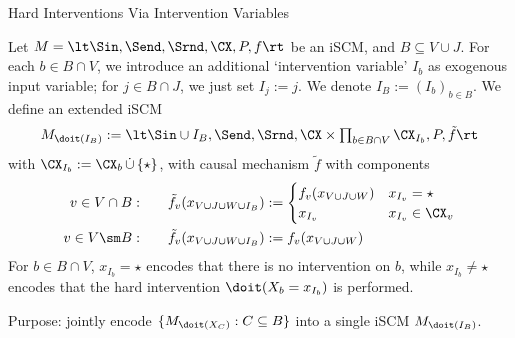 \begin{frame}{Hard Interventions Via Intervention Variables}
  \begin{Def}[\ref{def:scm_intervention_variables}]
  Let $M = \lt \Sin, \Send, \Srnd, \CX, P, f \rt$ be an iSCM, and $B \subseteq V \cup J$.
  For each $b \in B \cap V$, we introduce an additional `intervention variable' $I_b$ as exogenous input variable; for $j \in B \cap J$, we just set $I_j := j$.
  We denote $I_B := (I_b)_{b \in B}$.
  We define an extended iSCM 
  \vskip-2mm
  $$\textstyle M_{\doit(I_B)} := \lt \Sin \cup I_B, \Send, \Srnd, \CX \times \prod_{b \in B \cap V} \CX_{I_b}, P, \tilde{f} \rt$$
  with $\CX_{I_b} := \CX_b \,\dot\cup\, \{\star\}$, with causal mechanism $\tilde{f}$ with components
  \vskip-6mm
  \begin{align*}
    v \in V \cap B: \qquad &\tilde{f}_v(x_{V \cup J \cup W \cup I_B}) := \begin{cases}
      f_v(x_{V \cup J \cup W}) & x_{I_v} = \star \\
      x_{I_v} & x_{I_v} \in \CX_v
    \end{cases}\\
    v \in V \sm B: \qquad & \tilde{f}_v(x_{V \cup J \cup W \cup I_B}) := f_v(x_{V \cup J \cup W})
  \end{align*}
  \vskip-2mm
  For $b \in B \cap V$, $x_{I_b} = \star$ encodes that there is no intervention on $b$, while $x_{I_b} \ne \star$ encodes that the hard intervention $\doit(X_b = x_{I_b})$ is performed.
\end{Def}
Purpose: jointly encode $\{M_{\doit(X_C)} : C \subseteq B\}$ into a single iSCM $M_{\doit(I_B)}$.
\end{frame}

